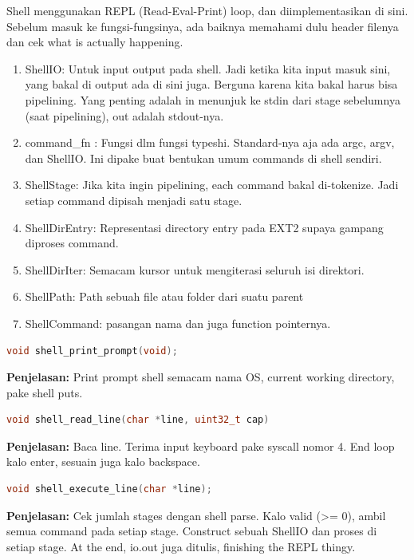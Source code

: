 Shell menggunakan REPL (Read-Eval-Print) loop, dan diimplementasikan di sini. Sebelum masuk ke fungsi-fungsinya, ada baiknya memahami dulu header filenya dan cek what is actually happening.

\begin{enumerate}
    \item ShellIO: Untuk input output pada shell. Jadi ketika kita input masuk sini, yang bakal di output ada di sini juga. Berguna karena kita bakal harus bisa pipelining. Yang penting adalah in menunjuk ke stdin dari stage sebelumnya (saat pipelining), out adalah stdout-nya.
    \item command\_fn : Fungsi dlm fungsi typeshi. Standard-nya aja ada argc, argv, dan ShellIO. Ini dipake buat bentukan umum commands di shell sendiri.
    \item ShellStage: Jika kita ingin pipelining, each command bakal di-tokenize. Jadi setiap command dipisah menjadi satu stage.
    \item ShellDirEntry: Representasi directory entry pada EXT2 supaya gampang diproses command.
    \item ShellDirIter: Semacam kursor untuk mengiterasi seluruh isi direktori.
    \item ShellPath: Path sebuah file atau folder dari suatu parent
    \item ShellCommand: pasangan nama dan juga function pointernya.
\end{enumerate}

\begin{lstlisting}[language=c]
    void shell_print_prompt(void);
\end{lstlisting}

\textbf{Penjelasan:} Print prompt shell semacam nama OS, current working directory, pake shell puts.

\begin{lstlisting}[language=c]
    void shell_read_line(char *line, uint32_t cap)
\end{lstlisting}

\textbf{Penjelasan:} Baca line. Terima input keyboard pake syscall nomor 4. End loop kalo enter, sesuain juga kalo backspace.

\begin{lstlisting}[language=c]
    void shell_execute_line(char *line);
\end{lstlisting}

\textbf{Penjelasan:} Cek jumlah stages dengan shell parse. Kalo valid (>= 0), ambil semua command pada setiap stage. Construct sebuah ShellIO dan proses di setiap stage. At the end, io.out juga ditulis, finishing the REPL thingy.

